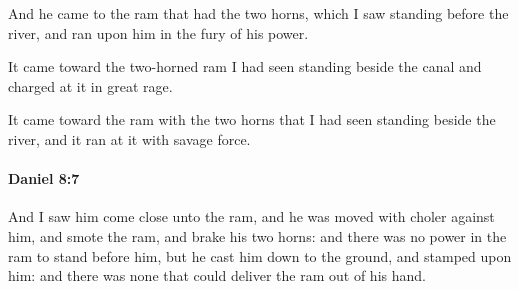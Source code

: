 			\begin{versebox}
					\item[BHS] 
					\item[LXX] 
					\item[ASV] And he came to the ram that had the two horns, which I saw standing before the river, and ran upon him in the fury of his power.
					\item[NIV] It came toward the two-horned ram I had seen standing beside the canal and charged at it in great rage.
					\item[NRSV] It came toward the ram with the two horns that I had seen standing beside the river, and it ran at it with savage force.
			\end{versebox}

		\paragraph{Daniel 8:7} %
			\label{DANIEL-8-7}

			And I saw him come close unto the ram, and he was moved with choler against him, and smote the ram, and brake his two horns: and there was no power in the ram to stand before him, but he cast him down to the ground, and stamped upon him: and there was none that could deliver the ram out of his hand.

